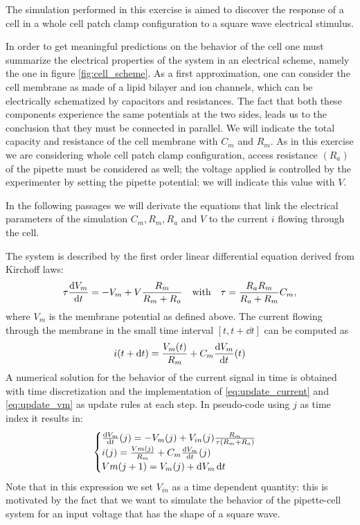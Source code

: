 \documentclass[a4paper]{article}
\begin{document}
The simulation performed in this exercise is aimed to discover the response of a cell in a whole cell patch clamp configuration to a square wave electrical stimulus.

In order to get meaningful predictions on the behavior of the cell one must summarize the electrical properties of the system in an electrical scheme, namely the one in figure \ref{fig:cell_scheme}.
As a first approximation, one can consider the cell membrane as made of a lipid bilayer and ion channels, which can be electrically schematized by capacitors and resistances.
The fact that both these components experience the same potentials at the two sides, leads us to the conclusion that they must be connected in parallel.
We will indicate the total capacity and resistance of the cell membrane with $C_m$ and $R_m.$
As in this exercise we are considering whole cell patch clamp configuration, access resistance $(R_a)$ of the pipette must be considered as well; the voltage applied is controlled by the experimenter by setting the pipette potential: we will indicate this value with $V.$

In the following passages we will derivate the equations that link the electrical parameters of the simulation $C_m, R_m, R_a$ and $V$ to the current $i$ flowing through the cell.

The system is described by the first order linear differential equation derived from Kirchoff laws:
\begin{equation}
    \tau\dv{V_m}{t} = -V_m +V \frac{R_m}{R_m+R_a} \qq{with} \tau = \frac{R_a R_m}{R_a + R_m}C_m,
    \label{eq:update_vm}
\end{equation}
where $V_m$ is the membrane potential as defined above.
The current flowing through the membrane in the small time interval $[t,t+\dd{t}]$ can be computed as 
\begin{equation}
i(t+\dd{t}) = \frac{V_m(t)}{R_m} + C_m \dv{V_m}{t} {(t)}
\label{eq:update_current}
\end{equation}
A numerical solution for the behavior of the current signal in time is obtained with time discretization and the implementation of \eqref{eq:update_current} and \eqref{eq:update_vm} as update rules at each step.
In pseudo-code using $j$ as time index it results in:
\begin{equation}
    \begin{cases}
        \dv{V_m}{t} {(j)} = -V_m(j) + V_{in}(j)\frac{R_m}{\tau(R_m +R_a)}\\
        i(j)= \frac{Vm(j)}{R_m} +C_m \dv{V_m}{t} {(j)}\\
        Vm(j+1) = V_m(j) +\dd{V_m} \dd{t}
    \end{cases}
\end{equation}
Note that in this expression we set $V_{in}$ as a time dependent quantity: this is motivated by the fact that we want to simulate the behavior of the pipette-cell system for an input voltage that has the shape of a square wave.
\end{document}
